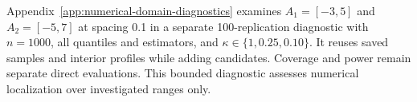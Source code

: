 Appendix~\ref{app:numerical-domain-diagnostics} examines $A_1=[-3,5]$ and $A_2=[-5,7]$ at spacing 0.1 in a separate 100-replication diagnostic with $n=1000$, all quantiles and estimators, and $\kappa\in\{1,0.25,0.10\}$. It reuses saved samples and interior profiles while adding candidates. Coverage and power remain separate direct evaluations. This bounded diagnostic assesses numerical localization over investigated ranges only.
